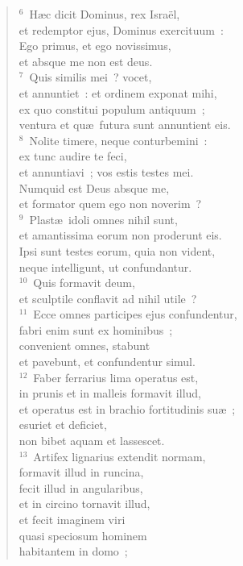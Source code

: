 \begin{flushleft}\begin{verse}${}^{6}$~H\ae c dicit Dominus, rex Isra\"el,\\ et redemptor ejus, Dominus exercituum~:\\ Ego primus, et ego novissimus,\\ et absque me non est deus.\\
${}^{7}$~Quis similis mei~? vocet,\\ et annuntiet~: et ordinem exponat mihi,\\ ex quo constitui populum antiquum~;\\ ventura et qu\ae\ futura sunt annuntient eis.\\
${}^{8}$~Nolite timere, neque conturbemini~:\\ ex tunc audire te feci,\\ et annuntiavi~; vos estis testes mei.\\ Numquid est Deus absque me,\\ et formator quem ego non noverim~?\\
${}^{9}$~Plast\ae\ idoli omnes nihil sunt,\\ et amantissima eorum non proderunt eis.\\ Ipsi sunt testes eorum, quia non vident,\\ neque intelligunt, ut confundantur.\\
${}^{10}$~Quis formavit deum,\\ et sculptile conflavit ad nihil utile~?\\
${}^{11}$~Ecce omnes participes ejus confundentur,\\ fabri enim sunt ex hominibus~;\\ convenient omnes, stabunt\\ et pavebunt, et confundentur simul.\\
${}^{12}$~Faber ferrarius lima operatus est,\\ in prunis et in malleis formavit illud,\\ et operatus est in brachio fortitudinis su\ae~;\\ esuriet et deficiet,\\ non bibet aquam et lassescet.\\
${}^{13}$~Artifex lignarius extendit normam,\\ formavit illud in runcina,\\ fecit illud in angularibus,\\ et in circino tornavit illud,\\ et fecit imaginem viri\\ quasi speciosum hominem\\ habitantem in domo~;\\

\end{verse}
\end{flushleft}
